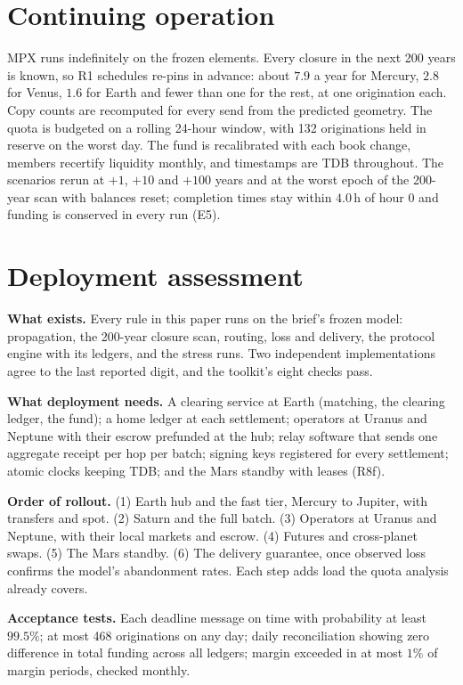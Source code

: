 \documentclass[11pt]{article}
\theoremstyle{definition}
\theoremstyle{remark}
\newcommand{\h}{\,\mathrm{h}}
\begin{document}
\section{Continuing operation}\label{sec:cont}
MPX runs indefinitely on the frozen elements. Every closure in the next 200 years is known, so R1 schedules re-pins in advance: about $7.9$ a year for Mercury, $2.8$ for Venus, $1.6$ for Earth and fewer than one for the rest, at one origination each. Copy counts are recomputed for every send from the predicted geometry. The quota is budgeted on a rolling 24-hour window, with 132 originations held in reserve on the worst day. The fund is recalibrated with each book change, members recertify liquidity monthly, and timestamps are TDB throughout. The scenarios rerun at $+1$, $+10$ and $+100$ years and at the worst epoch of the 200-year scan with balances reset; completion times stay within $4.0\h$ of hour 0 and funding is conserved in every run (E5).

\section{Deployment assessment}\label{sec:deploy}
\textbf{What exists.} Every rule in this paper runs on the brief's frozen model: propagation, the 200-year closure scan, routing, loss and delivery, the protocol engine with its ledgers, and the stress runs. Two independent implementations agree to the last reported digit, and the toolkit's eight checks pass.

\textbf{What deployment needs.} A clearing service at Earth (matching, the clearing ledger, the fund); a home ledger at each settlement; operators at Uranus and Neptune with their escrow prefunded at the hub; relay software that sends one aggregate receipt per hop per batch; signing keys registered for every settlement; atomic clocks keeping TDB; and the Mars standby with leases (R8f).

\textbf{Order of rollout.} (1) Earth hub and the fast tier, Mercury to Jupiter, with transfers and spot. (2) Saturn and the full batch. (3) Operators at Uranus and Neptune, with their local markets and escrow. (4) Futures and cross-planet swaps. (5) The Mars standby. (6) The delivery guarantee, once observed loss confirms the model's abandonment rates. Each step adds load the quota analysis already covers.

\textbf{Acceptance tests.} Each deadline message on time with probability at least $99.5\%$; at most 468 originations on any day; daily reconciliation showing zero difference in total funding across all ledgers; margin exceeded in at most $1\%$ of margin periods, checked monthly.
\end{document}
